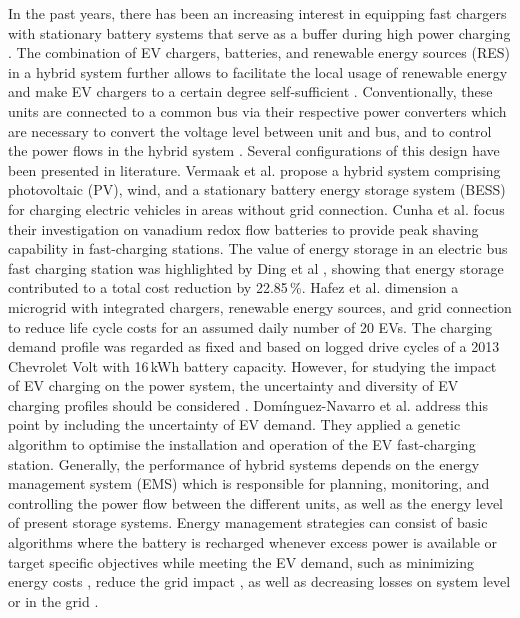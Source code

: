 \documentclass[final,5p,times,twocolumn]{elsarticle}
\begin{document}
In the past years, there has been an increasing interest in equipping fast chargers with stationary battery systems that serve as a buffer during high power charging \cite{Mahfouz.2020}. The combination of EV chargers, batteries, and renewable energy sources (RES) in a hybrid system further allows to facilitate the local usage of renewable energy and make EV chargers to a certain degree self-sufficient \cite{Simpson.2012, Liu.2020}. Conventionally, these units are connected to a common bus via their respective power converters which are necessary to convert the voltage level between unit and bus, and to control the power flows in the hybrid system \cite{Khalid.2019,Sbordone.2015}. Several configurations of this design have been presented in literature. Vermaak et al. \cite{Vermaak.2014} propose a hybrid system comprising photovoltaic (PV), wind, and a stationary battery energy storage system (BESS) for charging electric vehicles in areas without grid connection. Cunha et al. \cite{Cunha.2016} focus their investigation on vanadium redox flow batteries to provide peak shaving capability in fast-charging stations. The value of energy storage in an electric bus fast charging station was highlighted by Ding et al \cite{Ding.2015}, showing that energy storage contributed to a total cost reduction by 22.85\,\%. Hafez et al. \cite{Hafez.2017} dimension a microgrid with integrated chargers, renewable energy sources, and grid connection to reduce life cycle costs for an assumed daily number of 20 EVs. The charging demand profile was regarded as fixed and based on logged drive cycles of a 2013 Chevrolet Volt with 16\,kWh battery capacity. However, for studying the impact of EV charging on the power system, the uncertainty and diversity of EV charging profiles should be considered \cite{Calearo.2021}. Domínguez-Navarro et al. \cite{DominguezNavarro.2019} address this point by including the uncertainty of EV demand. They applied a genetic algorithm to optimise the installation and operation of the EV fast-charging station.
Generally, the performance of hybrid systems depends on the energy management system (EMS) which is responsible for planning, monitoring, and controlling the power flow between the different units, as well as the energy level of present storage systems. Energy management strategies can consist of basic algorithms where the battery is recharged whenever excess power is available \cite{Vermaak.2014} or target specific objectives while meeting the EV demand, such as minimizing energy costs \cite{Le.2015,Tushar.2014,Chaudhari.2016}, reduce the grid impact \cite{GarciaTrivino.2016,Deng.2016,Mumtaz.2017}, as well as decreasing losses on system level \cite{Gamboa.2010} or in the grid \cite{Acha.2010}. 
\end{document}

